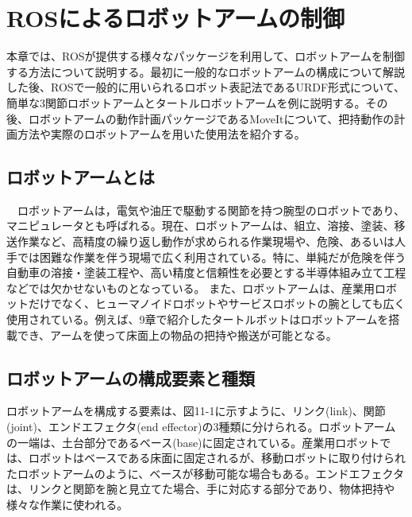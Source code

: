 
\chapter{ROSによるロボットアームの制御}

本章では、ROSが提供する様々なパッケージを利用して、ロボットアームを制御する方法について説明する。最初に一般的なロボットアームの構成について解説した後、ROSで一般的に用いられるロボット表記法であるURDF形式について、簡単な3関節ロボットアームとタートルロボットアームを例に説明する。その後、ロボットアームの動作計画パッケージであるMoveItについて、把持動作の計画方法や実際のロボットアームを用いた使用法を紹介する。

\section{ロボットアームとは}

　ロボットアームは，電気や油圧で駆動する関節を持つ腕型のロボットであり、マニピュレータとも呼ばれる。現在、ロボットアームは、組立、溶接、塗装、移送作業など、高精度の繰り返し動作が求められる作業現場や、危険、あるいは人手では困難な作業を伴う現場で広く利用されている。特に、単純だが危険を伴う自動車の溶接・塗装工程や、高い精度と信頼性を必要とする半導体組み立て工程などでは欠かせないものとなっている。
また、ロボットアームは、産業用ロボットだけでなく、ヒューマノイドロボットやサービスロボットの腕としても広く使用されている。例えば、9章で紹介したタートルボットはロボットアームを搭載でき、アームを使って床面上の物品の把持や搬送が可能となる。

\section{ロボットアームの構成要素と種類}

ロボットアームを構成する要素は、図11-1に示すように、リンク(link)、関節(joint)、エンドエフェクタ(end effector)の3種類に分けられる。ロボットアームの一端は、土台部分であるベース(base)に固定されている。産業用ロボットでは、ロボットはベースである床面に固定されるが、移動ロボットに取り付けられたロボットアームのように、ベースが移動可能な場合もある。エンドエフェクタは、リンクと関節を腕と見立てた場合、手に対応する部分であり、物体把持や様々な作業に使われる。



